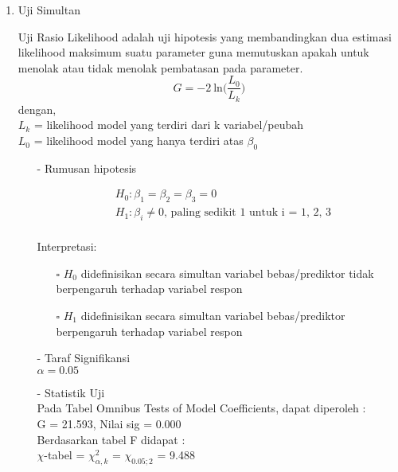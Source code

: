 \begin{enumerate}
    \def\labelenumi{\arabic{enumi}.}
    \tightlist
    \item Uji Simultan
    \begin{sloppypar}
    Uji Rasio Likelihood adalah uji hipotesis yang membandingkan dua estimasi likelihood maksimum suatu parameter guna memutuskan apakah untuk menolak atau tidak menolak pembatasan pada parameter. $$G = -2\ \text{ln} \Big( \frac{L_0}{L_k} \Big)$$
    dengan, \\$L_k$ = likelihood model yang terdiri dari k variabel/peubah \\$L_0$ = likelihood model yang hanya terdiri atas $\beta_0$
    \end{sloppypar}
    \begin{test}{
    \begin{enumerate}
        \item[-] Rumusan hipotesis \\
        \begin{fleqn}[\parindent]
            \begin{equation*}
            \begin{split}
            &H_0 : \beta_1 = \beta_2 = \beta_3 = 0 \\ 
            &H_1 : \beta_i \neq 0 \text{, paling sedikit 1 untuk i = 1, 2, 3} \\
            \end{split}
            \end{equation*}
        \end{fleqn}
        Interpretasi:
        \begin{enumerate}
        \item[$\square$] $H_0$ didefinisikan secara simultan variabel bebas/prediktor tidak berpengaruh terhadap variabel respon
        \item[$\square$] $H_1$ didefinisikan secara simultan variabel bebas/prediktor berpengaruh terhadap variabel respon
        \end{enumerate}
    
        \item[-] Taraf Signifikansi \\
        $\alpha = 0.05$
    
        \item[-] Statistik Uji \\
        Pada Tabel Omnibus Tests of Model Coefficients, dapat diperoleh : \\
        G = 21.593, Nilai sig = 0.000 \\
        Berdasarkan tabel F didapat : \\
        $\chi$-tabel = $\chi_{\alpha, k}^2$ = $\chi_{0.05; 2}$ = 9.488
    

\end{enumerate}}
\end{test}
\end{enumerate}
